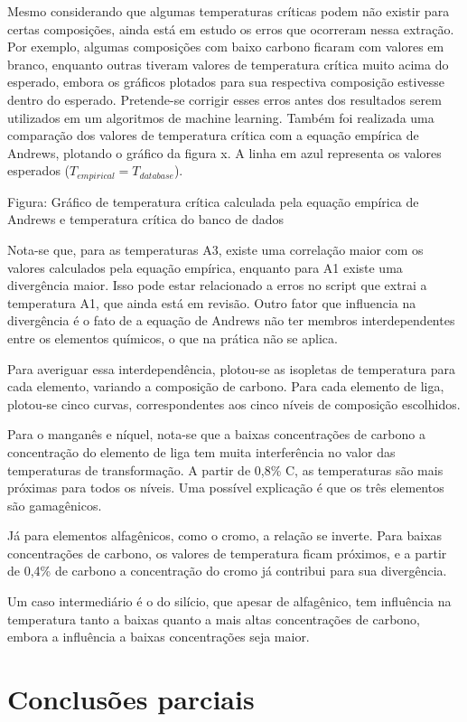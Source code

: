 \documentclass[brazil,dissertacao,epusp]{usp}
\begin{document}
Mesmo considerando que algumas temperaturas críticas podem não existir para certas composições, ainda está em estudo os erros que ocorreram nessa extração. Por exemplo, algumas composições com baixo carbono ficaram com valores em branco, enquanto outras tiveram valores de temperatura crítica muito acima do esperado, embora os gráficos plotados para sua respectiva composição estivesse dentro do esperado. Pretende-se corrigir esses erros antes dos resultados serem utilizados em um algoritmos de machine learning.
Também foi realizada uma comparação dos valores de temperatura crítica com a equação empírica de Andrews, plotando o gráfico da figura x. A linha em azul representa os valores esperados ($T_{empirical} = T_{database}$).

Figura: Gráfico de temperatura crítica calculada pela equação empírica de Andrews e temperatura crítica do banco de dados

Nota-se que, para as temperaturas A3, existe uma correlação maior com os valores calculados pela equação empírica, enquanto para A1 existe uma divergência maior. Isso pode estar relacionado a erros no script que extrai a temperatura A1, que ainda está em revisão. Outro fator que influencia na divergência é o fato de a equação de Andrews não ter membros interdependentes entre os elementos químicos, o que na prática não se aplica.

Para averiguar essa interdependência, plotou-se as isopletas de temperatura para cada elemento, variando a composição de carbono. Para cada elemento de liga, plotou-se cinco curvas, correspondentes aos cinco níveis de composição escolhidos.

Para o manganês e níquel, nota-se que a baixas concentrações de carbono a concentração do elemento de liga tem muita interferência no valor das temperaturas de transformação. A partir de 0,8\% C, as temperaturas são mais próximas para todos os níveis. Uma possível explicação é que os três elementos são gamagênicos.

Já para elementos alfagênicos, como o cromo, a relação se inverte. Para baixas concentrações de carbono, os valores de temperatura ficam próximos, e a partir de 0,4\% de carbono a concentração do cromo já contribui para sua divergência.

Um caso intermediário é o do silício, que apesar de alfagênico, tem influência na temperatura tanto a baixas quanto a mais altas concentrações de carbono, embora a influência a baixas concentrações seja maior.

\chapter{Conclusões parciais}


\end{document}
